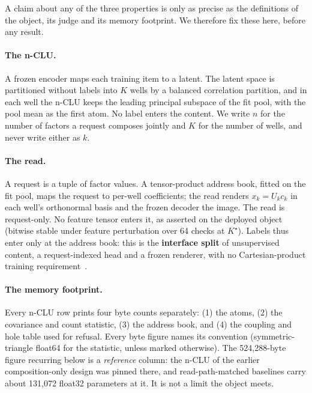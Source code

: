 \documentclass{article} %
\newcommand{\Kstar}{\ensuremath{K^{\star}}}
\begin{document}
A claim about any of the three properties is only as precise as the definitions of the object,
its judge and its memory footprint. We therefore fix these here, before any result.

\paragraph{The n-CLU.} A frozen encoder maps each training item to a latent. The latent
space is partitioned without labels into $K$ wells by a balanced correlation partition, and in
each well the n-CLU keeps the leading principal subspace of the fit pool, with the pool mean as
the first atom. No label enters the content. We write $n$ for the number of factors a request
composes jointly and $K$ for the number of wells, and never write either as $k$.

\paragraph{The read.} A request is a tuple of factor values. A tensor-product address book,
fitted on the fit pool, maps the request to per-well coefficients; the read renders
$x_k=U_k c_k$ in each well's orthonormal basis and the frozen decoder the image.
The read is request-only. No feature tensor enters it, as asserted on the deployed object
(bitwise stable under feature perturbation over 64 checks at $\Kstar$).
Labels thus enter only at the address book: this is the \textbf{interface split} of unsupervised content, a request-indexed head and a frozen renderer, with no
Cartesian-product training requirement~\citep{wiedemer_compositional_2023,lachapelle_additive_2023,montero_lost_2022}.

\paragraph{The memory footprint.} Every n-CLU row prints four byte counts
separately: (1) the atoms, (2) the covariance and count statistic, (3) the address book, and
(4) the coupling and hole table used for refusal.
Every byte figure names its convention
(symmetric-triangle float64 for the statistic, unless marked otherwise). The 524,288-byte figure
recurring below is a \emph{reference} column: the n-CLU of the earlier composition-only design
was pinned there, and read-path-matched baselines carry about 131,072 float32 parameters at it. %
It is not a limit the object meets.
\end{document}
